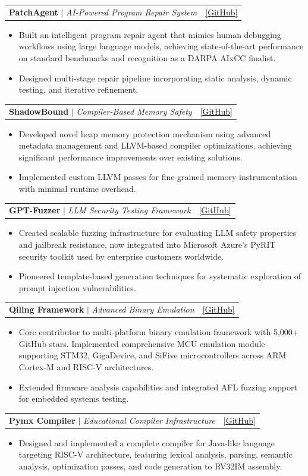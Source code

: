 \documentclass[letterpaper,11pt]{article}
\makeatletter
\newcommand{\resumeItem}[1]{
  \item\small{
    {#1 \vspace{-2pt}}
  }
}
\newcommand{\resumeProjectHeading}[2]{
    \item
    \begin{tabular*}{0.97\textwidth}{l@{\extracolsep{\fill}}r}
      \small#1 & #2 \\
    \end{tabular*}\vspace{-7pt}
}
\newcommand{\resumeItemListStart}{\begin{itemize}}
\newcommand{\resumeItemListEnd}{\end{itemize}\vspace{-5pt}}
\makeatother
\begin{document}
  \resumeProjectHeading
      {\textbf{PatchAgent} $|$ \emph{AI-Powered Program Repair System}}{\href{https://github.com/cla7aye15I4nd/PatchAgent}{[\underline{GitHub}]}}
      \resumeItemListStart
        \resumeItem{Built an intelligent program repair agent that mimics human debugging workflows using large language models, achieving state-of-the-art performance on standard benchmarks and recognition as a DARPA AIxCC finalist.}
        \resumeItem{Designed multi-stage repair pipeline incorporating static analysis, dynamic testing, and iterative refinement.}
      \resumeItemListEnd

  \resumeProjectHeading
      {\textbf{ShadowBound} $|$ \emph{Compiler-Based Memory Safety}}{\href{https://github.com/cla7aye15I4nd/ShadowBound}{[\underline{GitHub}]}}
      \resumeItemListStart
        \resumeItem{Developed novel heap memory protection mechanism using advanced metadata management and LLVM-based compiler optimizations, achieving significant performance improvements over existing solutions.}
        \resumeItem{Implemented custom LLVM passes for fine-grained memory instrumentation with minimal runtime overhead.}
      \resumeItemListEnd

  \resumeProjectHeading
      {\textbf{GPT-Fuzzer} $|$ \emph{LLM Security Testing Framework}}{\href{https://github.com/sherdencooper/GPTFuzz}{[\underline{GitHub}]}}
      \resumeItemListStart
        \resumeItem{Created scalable fuzzing infrastructure for evaluating LLM safety properties and jailbreak resistance, now integrated into Microsoft Azure's PyRIT security toolkit used by enterprise customers worldwide.}
        \resumeItem{Pioneered template-based generation techniques for systematic exploration of prompt injection vulnerabilities.}
      \resumeItemListEnd

  \resumeProjectHeading
      {\textbf{Qiling Framework} $|$ \emph{Advanced Binary Emulation}}{\href{https://github.com/qilingframework/qiling}{[\underline{GitHub}]}}
      \resumeItemListStart
        \resumeItem{Core contributor to multi-platform binary emulation framework with 5,000+ GitHub stars. Implemented comprehensive MCU emulation module supporting STM32, GigaDevice, and SiFive microcontrollers across ARM Cortex-M and RISC-V architectures.}
        \resumeItem{Extended firmware analysis capabilities and integrated AFL fuzzing support for embedded systems testing.}
      \resumeItemListEnd

  \resumeProjectHeading
      {\textbf{Pymx Compiler} $|$ \emph{Educational Compiler Infrastructure}}{\href{https://github.com/cla7aye15I4nd/Pymx}{[\underline{GitHub}]}}
      \resumeItemListStart
        \resumeItem{Designed and implemented a complete compiler for Java-like language targeting RISC-V architecture, featuring lexical analysis, parsing, semantic analysis, optimization passes, and code generation to RV32IM assembly.}
      \resumeItemListEnd
\end{document}
